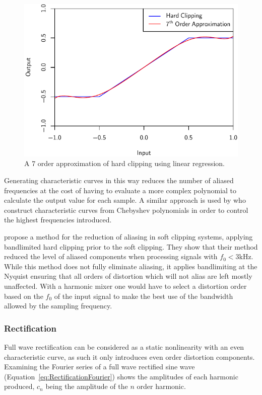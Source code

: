 			\begin{figure}[h!]
				\centering
				\includegraphics{chapter5/Images/ClippingApproximation.pdf}
				\caption{A 7 order approximation of hard clipping using linear regression.}
				\label{fig:ClippingApproximation}
			\end{figure}

			Generating characteristic curves in this way reduces the number of aliased frequencies at the cost
			of having to evaluate a more complex polynomial to calculate the output value for each sample. A
			similar approach is used by \citet{fernandez-cid2001distortion} who construct characteristic curves
			from Chebyshev polynomials in order to control the highest frequencies introduced.

			\citet{esqueda2015aliasing} propose a method for the reduction of aliasing in soft clipping
			systems, applying bandlimited hard clipping prior to the soft clipping. They show that their method
			reduced the level of aliased components when processing signals with $f_{0} < 3$kHz. While this
			method does not fully eliminate aliasing, it applies bandlimiting at the Nyquist ensuring that all
			orders of distortion which will not alias are left mostly unaffected. With a harmonic mixer one
			would have to select a distortion order based on the $f_{0}$ of the input signal to make the best
			use of the bandwidth allowed by the sampling frequency.

		\subsubsection*{Rectification}
			Full wave rectification can be considered as a static nonlinearity with an even characteristic
			curve, as such it only introduces even order distortion components. Examining the Fourier series of
			a full wave rectified sine wave (Equation~\ref{eq:RectificationFourier}) shows the amplitudes of
			each harmonic produced, $c_{n}$ being the amplitude of the $n$ order harmonic.

